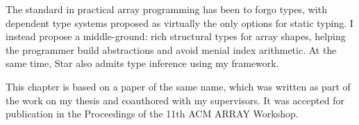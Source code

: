 The standard in practical array programming has been to forgo types, with dependent type systems proposed as virtually the only options for static typing. I instead propose a middle-ground: rich structural types for array shapes, helping the programmer build abstractions and avoid menial index arithmetic. At the same time, Star also admits type inference using my framework.

This chapter is based on a paper of the same name, which was written as part of the work on my thesis and coauthored with my supervisors. It was accepted for publication in the Proceedings of the 11th ACM ARRAY Workshop. 